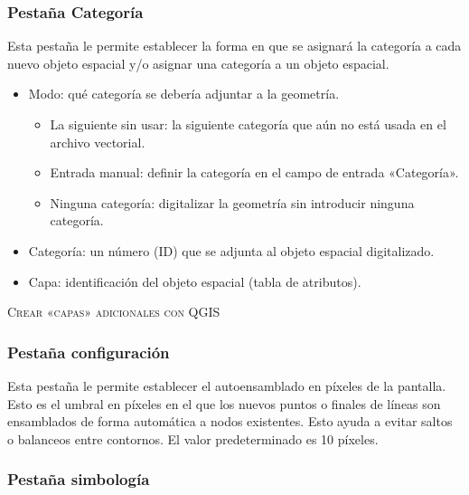 \subsubsection{Pestaña Categoría}

Esta pestaña le permite establecer la forma en que se asignará la categoría a cada nuevo objeto espacial y/o asignar una categoría a un objeto espacial.

\begin{itemize}
\item Modo: qué categoría se debería adjuntar a la geometría.
\begin{itemize}
\item La siguiente sin usar: la siguiente categoría que aún no está usada en el archivo vectorial.
\item Entrada manual: definir la categoría en el campo de entrada «Categoría».
\item Ninguna categoría: digitalizar la geometría sin introducir ninguna categoría.
\end{itemize}
\item Categoría: un número (ID) que se adjunta al objeto espacial digitalizado.
\item Capa: identificación del objeto espacial (tabla de atributos).
\end{itemize}

\begin{Tip}\caption{\textsc{Crear «capas» adicionales con QGIS}}
\end{Tip}

\subsubsection{Pestaña configuración}\label{label_settingtab}

Esta pestaña le permite establecer el autoensamblado en píxeles de la pantalla. Esto es el umbral en píxeles en el que los nuevos puntos o finales de líneas son ensamblados de forma automática a nodos existentes. Esto ayuda a evitar saltos o balanceos entre contornos. El valor predeterminado es 10 píxeles.

\subsubsection{Pestaña simbología}


